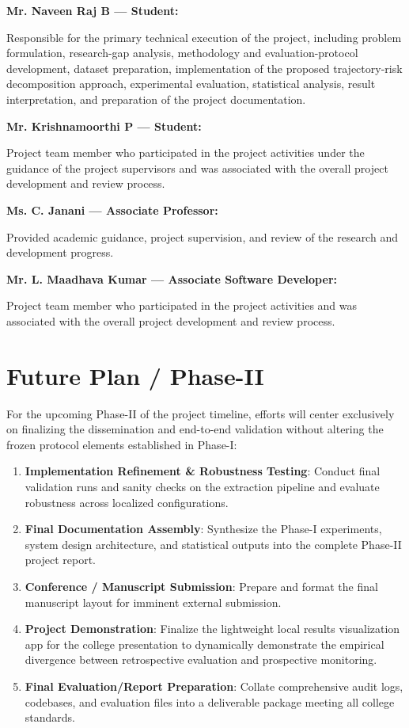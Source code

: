 \documentclass[12pt,a4paper]{article}
\begin{document}
\textbf{Mr. Naveen Raj B --- Student:}

Responsible for the primary technical execution of the project, including problem formulation, research-gap analysis, methodology and evaluation-protocol development, dataset preparation, implementation of the proposed trajectory-risk decomposition approach, experimental evaluation, statistical analysis, result interpretation, and preparation of the project documentation.

\vspace{0.5em}
\noindent
\textbf{Mr. Krishnamoorthi P --- Student:}

Project team member who participated in the project activities under the guidance of the project supervisors and was associated with the overall project development and review process.

\vspace{0.5em}
\noindent
\textbf{Ms. C. Janani --- Associate Professor:}

Provided academic guidance, project supervision, and review of the research and development progress.

\vspace{0.5em}
\noindent
\textbf{Mr. L. Maadhava Kumar --- Associate Software Developer:}

Project team member who participated in the project activities and was associated with the overall project development and review process.

\newpage


\newpage

\section{Future Plan / Phase-II}
For the upcoming Phase-II of the project timeline, efforts will center exclusively on finalizing the dissemination and end-to-end validation without altering the frozen protocol elements established in Phase-I:

\begin{enumerate}[label=\arabic*.]
    \item \textbf{Implementation Refinement \& Robustness Testing}: Conduct final validation runs and sanity checks on the extraction pipeline and evaluate robustness across localized configurations.
    \item \textbf{Final Documentation Assembly}: Synthesize the Phase-I experiments, system design architecture, and statistical outputs into the complete Phase-II project report.
    \item \textbf{Conference / Manuscript Submission}: Prepare and format the final manuscript layout for imminent external submission.
    \item \textbf{Project Demonstration}: Finalize the lightweight local results visualization app for the college presentation to dynamically demonstrate the empirical divergence between retrospective evaluation and prospective monitoring.
    \item \textbf{Final Evaluation/Report Preparation}: Collate comprehensive audit logs, codebases, and evaluation files into a deliverable package meeting all college standards.
\end{enumerate}
\end{document}

